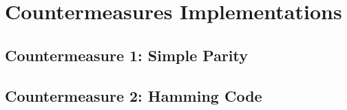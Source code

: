 \chapter{Countermeasures Implementations}
\label{chapter:countermeasures}
\minitoc


\section{Countermeasure 1: Simple Parity}


\section{Countermeasure 2: Hamming Code}







